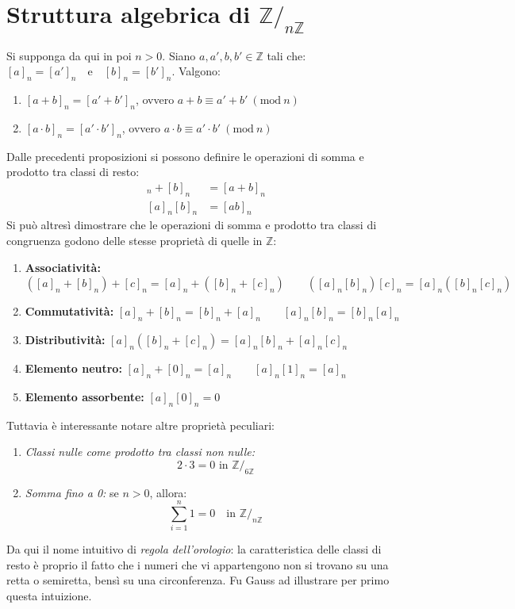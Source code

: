 \documentclass[oneside]{book}
\theoremstyle{remark}
\newcommand{\Mod}[1]{\ (\mathrm{mod}\ #1)} %
\begin{document}
\section{Struttura algebrica di $\mathbb{Z}/_{n\mathbb{Z}}$}
Si supponga da qui in poi $n>0$. Siano $a,a',b,b' \in \mathbb{Z}$ tali che:
$ [a]_n = [a']_n \quad \text{e} \quad [b]_n = [b']_n $.
Valgono:
\begin{enumerate}
\item $[a+b]_n = [a'+b']_n$, ovvero $a+b \equiv a'+b' \Mod{n}$
\item $[a \cdot b]_n = [a' \cdot b']_n$, ovvero $a \cdot b \equiv a' \cdot b' \Mod{n}$
\end{enumerate}
Dalle precedenti proposizioni si possono definire le operazioni di
somma e prodotto tra classi di resto:
\begin{align*}
[a]_n+[b]_n &= [a+b]_n\\
[a]_n[b]_n &= [ab]_n
\end{align*}
Si può altresì dimostrare che le operazioni
di somma e prodotto tra classi di congruenza godono delle
stesse proprietà di quelle in $\mathbb{Z}$:
\begin{enumerate}
\item \textbf{Associatività:} $([a]_n + [b]_n) + [c]_n = [a]_n + ([b]_n + [c]_n) \qquad ([a]_n[b]_n)[c]_n = [a]_n([b]_n[c]_n)$
\item \textbf{Commutatività:} $[a]_n + [b]_n = [b]_n + [a]_n \qquad [a]_n[b]_n = [b]_n[a]_n$
\item \textbf{Distributività:} $[a]_n([b]_n+[c]_n) = [a]_n[b]_n + [a]_n[c]_n$
\item \textbf{Elemento neutro:} $[a]_n + [0]_n = [a]_n \qquad [a]_n[1]_n = [a]_n$
\item \textbf{Elemento assorbente:} $[a]_n[0]_n = 0$
\end{enumerate}
Tuttavia è interessante notare altre proprietà peculiari:
\begin{enumerate}
\item \textit{Classi nulle come prodotto tra classi non nulle:} \[ 2 \cdot 3 = 0 \text{ in } \mathbb{Z}/_{6\mathbb{Z}} \]
\item \textit{Somma fino a 0:} se $n>0$, allora: \[ \sum_{i=1}^{n} 1 = 0 \quad \text{in } \mathbb{Z}/_{n\mathbb{Z}} \]
\end{enumerate}
Da qui il nome intuitivo di \textit{regola dell'orologio}: la caratteristica delle classi
di resto è proprio il fatto che i numeri che vi appartengono non si trovano su una
retta o semiretta, bensì su una circonferenza. Fu Gauss ad illustrare per primo
questa intuizione.
\end{document}
